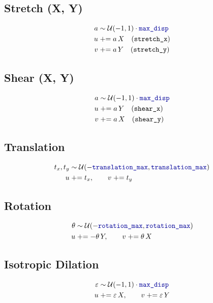 \documentclass[11pt]{article}
\newcommand{\param}[1]{\texttt{\color{blue!60!black}#1}}
\begin{document}
\subsection{Stretch (X, Y)}
\begin{align}
a &\sim \mathcal{U}(-1,1)\cdot \param{max\_disp} \\
u &\mathrel{+}= a\,X \quad \text{(\texttt{stretch\_x})} \\
v &\mathrel{+}= a\,Y \quad \text{(\texttt{stretch\_y})}
\end{align}

\subsection{Shear (X, Y)}
\begin{align}
a &\sim \mathcal{U}(-1,1)\cdot \param{max\_disp} \\
u &\mathrel{+}= a\,Y \quad \text{(\texttt{shear\_x})} \\
v &\mathrel{+}= a\,X \quad \text{(\texttt{shear\_y})}
\end{align}

\subsection{Translation}
\begin{align}
t_x, t_y &\sim \mathcal{U}(-\param{translation\_max}, \param{translation\_max}) \\
u &\mathrel{+}= t_x, \qquad v \mathrel{+}= t_y
\end{align}

\subsection{Rotation}
\begin{align}
\theta &\sim \mathcal{U}(-\param{rotation\_max}, \param{rotation\_max}) \\
u &\mathrel{+}= -\theta\,Y, \qquad v \mathrel{+}= \theta\,X
\end{align}

\subsection{Isotropic Dilation}
\begin{align}
\varepsilon &\sim \mathcal{U}(-1,1)\cdot \param{max\_disp} \\
u &\mathrel{+}= \varepsilon\,X, \qquad v \mathrel{+}= \varepsilon\,Y
\end{align}
\end{document}
